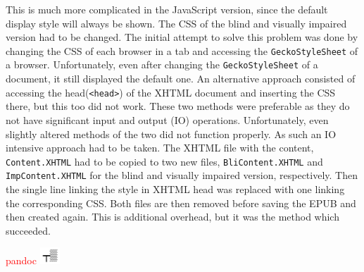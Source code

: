 This is much more complicated in the JavaScript version, since the default display style will always be shown. The CSS of the blind and visually impaired version had to be changed. The initial attempt to solve this problem was done by changing the CSS of each browser in a tab and accessing the \lstinline|GeckoStyleSheet| of a browser. Unfortunately, even after changing the \lstinline|GeckoStyleSheet| of a document, it still displayed the default one. An alternative approach consisted of accessing the head(\lstinline|<head>|) of the XHTML document and inserting the CSS there, but this too did not work. These two methods were preferable as they do not have significant input and output (IO) operations. Unfortunately, even slightly altered methods of the two did not function properly. As such an IO intensive approach had to be taken. The XHTML file with the content, \lstinline|Content.XHTML| had to be copied to two new files, \lstinline|BliContent.XHTML| and \lstinline|ImpContent.XHTML| for the blind and visually impaired version, respectively. Then the single line linking the style in XHTML head was replaced with one linking the corresponding CSS. 
Both files are then removed before saving the EPUB and then created again. This is additional overhead, but it was the method which succeeded.

\textcolor{red}{pandoc } %
\includegraphics[width=2em]{figures/pandocSigns.png}

